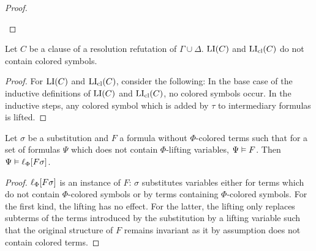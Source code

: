 \documentclass[,%
	draft=false,%
	numbers=noendperiod
	11pt,
	a4paper,
	oneside,%
	openany,
]{memoir}
\begin{document}
{\begin{proof}
\begin{description}
			\begin{comment}
				Let $l$ and $l'$ be the resolved or factorised literals.
				By the induction hypothesis,
				$l\cll = \lifboth{l}$
				and
				$l'\cll = \lifboth{l'}$.

				By a similar reasoning as above, we get that $\lifboth{\lifboth{\lambda}\tau} = \lifboth{\lambda\sigma}$ for any literal $\lambda$ in $\bbar C$.

				$\lifboth{\lambda\cll\tau} = \lifboth{\lifboth{\lambda}\tau}$
				But as $l\sigma = l'\sigma$ and

				$\lifboth{\lifboth{l}\tau } =
				\lifboth{\lifboth{l'}\tau }
				$

				As no lifting variables occur in $l$ or $l'$, we get that $l\tau = l'\tau$, which we can lift to $\lifboth{l\tau} = \lifboth{l'\tau}$.

				Note that $l\sigma = l'\sigma$.

				$l\cll = \lifboth{l}$

				$\lifboth{ \lifboth{l} \tau} = \lifboth{l\tau}$

			\end{comment}
	\end{description}
\end{proof}


\begin{lemma}
	\label{lemma:no_colored_terms}
	Let $C$ be a clause of a resolution refutation of $\Gamma\cup\Delta$.
	$\operatorname{LI}(C)$ and $\operatorname{LI}_{\operatorname{cl}}(C)$ do not contain colored symbols.
\end{lemma}
\begin{proof}
	For $\operatorname{LI}(C)$ and $\operatorname{LI}_{\operatorname{cl}}(C)$, consider the following:
	In the base case of the inductive definitions of $\operatorname{LI}(C)$ and $\operatorname{LI}_{\operatorname{cl}}(C)$, no colored symbols occur.
	In the inductive steps, any colored symbol which is added by $\tau$ to intermediary formulas is lifted.
\end{proof}

}

\begin{lemma}
	\label{lemma:substitute_and_lift}
	Let $\sigma$ be a substitution and $F$ a formula without $\Phi$-colored terms such that for a set of formulas $\Psi$ which does not contain $\Phi$-lifting variables, $\Psi \vDash F$.
	Then $\Psi \vDash \ell_{\Phi}[F\sigma]$.
\end{lemma}
\begin{proof}
	$\ell_{\Phi}[F\sigma]$ is an instance of $F$:
	$\sigma$ substitutes variables either for terms which do not contain $\Phi$-colored symbols or by terms containing $\Phi$-colored symbols.
	For the first kind, the lifting has no effect.
	For the latter, the lifting only replaces subterms of the terms introduced by the substitution by a lifting variable such that the original structure of $F$ remains invariant as it by assumption does not contain colored terms.
\end{proof}
\end{document}
